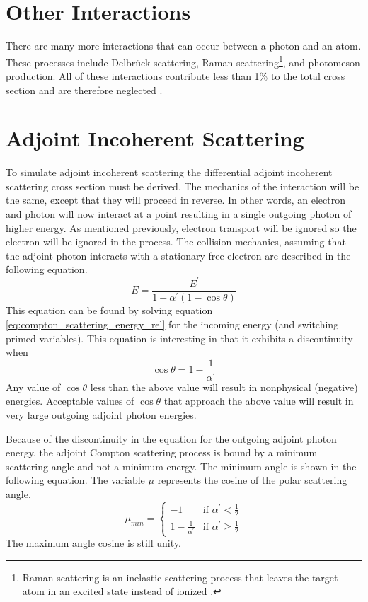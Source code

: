 \section{Other Interactions}
There are many more interactions that can occur between a photon and an atom.
These processes include Delbr\"{u}ck scattering, Raman scattering\footnote{Raman scattering is an inelastic scattering process that leaves the target atom in an excited state instead of ionized \citep{cullen_epdl97_1997}.}, and 
photomeson production. All of these interactions contribute less than 1\% to the
total cross section and are therefore neglected \citep{lux_monte_1991}.

\section{Adjoint Incoherent Scattering}
To simulate adjoint incoherent scattering the differential adjoint incoherent 
scattering cross section must be derived. The mechanics of the interaction will
be the same, except that they will proceed in reverse. In other words, an
electron and photon will now interact at a point resulting in a single outgoing
photon of higher energy. As mentioned previously, electron transport will be
ignored so the electron will be ignored in the process. The collision mechanics,
assuming that the adjoint photon interacts with a stationary free electron are
described in the following equation.
\begin{equation}
  E = \frac{E^{'}}{1-\alpha^{'}(1-\cos{\theta})}
\label{eq:adjoint_energy_angle_relation}
\end{equation}
This equation can be found by solving equation 
\ref{eq:compton_scattering_energy_rel} for the incoming energy (and switching
primed variables). This equation is interesting in that it exhibits a 
discontinuity when 
\begin{equation}
  \cos{\theta} = 1 - \frac{1}{\alpha^{'}}
\end{equation}
Any value of $\cos{\theta}$ less than the above value will result in nonphysical
(negative) energies. Acceptable values of $\cos{\theta}$ that approach the 
above value will result in very large outgoing adjoint photon energies. 

Because of the discontinuity in the equation for the outgoing adjoint photon
energy, the adjoint Compton scattering process is bound by a minimum scattering
angle and not a minimum energy. The minimum angle is shown in the following 
equation. The variable $\mu$ represents the cosine of the polar scattering 
angle.
\begin{equation}
  \mu_{min} = 
  \begin{cases}
    -1 & \text{if } \alpha^{'} < \frac{1}{2} \\
    1 - \frac{1}{\alpha^{'}} & \text{if } \alpha^{'} \geq \frac{1}{2} 
  \end{cases}
\end{equation}
The maximum angle cosine is still unity.

